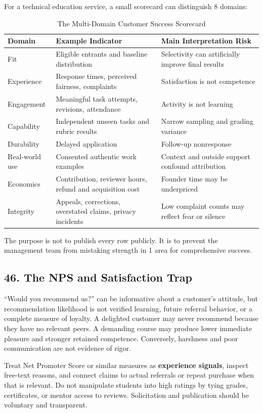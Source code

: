 For a technical education service, a small scorecard can distinguish 8 domains:

\begin{table}[t]
\centering
\small
\caption{The Multi-Domain Customer Success Scorecard}
\begin{tabularx}{\textwidth}{p{}p{}X}
\toprule
\textbf{Domain} & \textbf{Example Indicator} & \textbf{Main Interpretation Risk} \\
\midrule
Fit & Eligible entrants and baseline distribution & Selectivity can artificially improve final results \\
Experience & Response times, perceived fairness, complaints & Satisfaction is not competence \\
Engagement & Meaningful task attempts, revisions, attendance & Activity is not learning \\
Capability & Independent unseen tasks and rubric results & Narrow sampling and grading variance \\
Durability & Delayed application & Follow-up nonresponse \\
Real-world use & Consented authentic work examples & Context and outside support confound attribution \\
Economics & Contribution, reviewer hours, refund and acquisition cost & Founder time may be underpriced \\
Integrity & Appeals, corrections, overstated claims, privacy incidents & Low complaint counts may reflect fear or silence \\
\bottomrule
\end{tabularx}
\end{table}

The purpose is not to publish every row publicly. It is to prevent the management team from mistaking strength in 1 area for comprehensive success.

\subsection*{46. The NPS and Satisfaction Trap}

``Would you recommend us?'' can be informative about a customer's attitude, but recommendation likelihood is not verified learning, future referral behavior, or a complete measure of loyalty. A delighted customer may never recommend because they have no relevant peers. A demanding course may produce lower immediate pleasure and stronger retained competence. Conversely, harshness and poor communication are not evidence of rigor.

Treat Net Promoter Score or similar measures as \textbf{experience signals}, inspect free-text reasons, and connect claims to actual referrals or repeat purchase when that is relevant. Do not manipulate students into high ratings by tying grades, certificates, or mentor access to reviews. Solicitation and publication should be voluntary and transparent.
